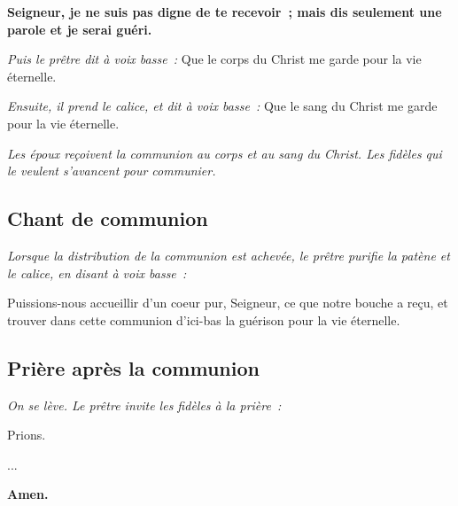{\bf Seigneur, je ne suis pas digne de te recevoir~;                            
mais dis seulement une parole et je serai guéri.}

\emph{Puis le prêtre dit à voix basse~:}
Que le corps du Christ me garde pour la vie éternelle.

\emph{Ensuite, il prend le calice, et dit à voix basse~:}
Que le sang du Christ me garde pour la vie éternelle.


\emph{Les époux reçoivent la communion au corps et au sang du                   
Christ. Les fidèles qui le veulent s'avancent pour communier.}

\subsection*{Chant de communion}

\emph{Lorsque la distribution de la communion est achevée, le prêtre            
purifie la patène et le calice, en disant à voix basse~:}

Puissions-nous accueillir d'un coeur pur, Seigneur, ce que notre
bouche a reçu, et trouver dans cette communion d'ici-bas la guérison
pour la vie éternelle.

\subsection*{Prière après la communion}

\emph{On se lève. Le prêtre invite les fidèles à la prière~:}

Prions.

...

{\bf Amen.}
